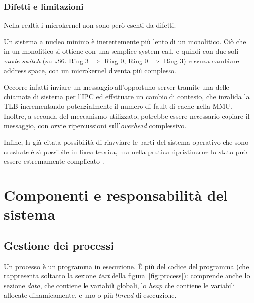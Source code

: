 \documentclass[12pt,a4paper]{report}
\begin{document}
			\subsubsection{Difetti e limitazioni}
				Nella realtà i microkernel non sono però esenti da difetti.
				
				Un sistema a nucleo minimo è inerentemente più lento di un monolitico. Ciò che in un monolitico
				si ottiene con una semplice system call, e quindi con due soli \emph{mode switch}
				(su x86: Ring 3 $\Rightarrow$ Ring 0, Ring 0 $\Rightarrow$ Ring 3) e senza cambiare address space, con un microkernel
				diventa più complesso.
				
				Occorre infatti inviare un messaggio all'opportuno server tramite una delle chiamate di sistema
				per l'IPC ed effettuare un cambio di contesto, che invalida la TLB incrementando potenzialmente
				il numero di fault di cache nella MMU. Inoltre, a seconda del meccanismo utilizzato, potrebbe
				essere necessario copiare il messaggio, con ovvie ripercussioni sull'\emph{overhead} complessivo.			
				
				Infine, la già citata possibilità di riavviare le parti del sistema operativo che sono crashate è sì possibile in linea
				teorica, ma nella pratica ripristinarne lo stato può essere estremamente complicato \cite{OSDEV_Microkernel}.
	
	\section{Componenti e responsabilità del sistema}
		\subsection{Gestione dei processi}
			Un processo è un programma in esecuzione. È più del codice del programma (che rappresenta soltanto la
			sezione \emph{text} della figura~\ref{fig:process}): comprende anche lo sezione \emph{data}, che contiene le variabili
			globali, lo \emph{heap} che contiene le variabili allocate dinamicamente, e uno o più \emph{thread} di esecuzione.
		
\end{document}
